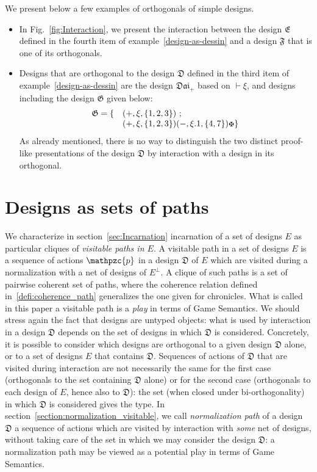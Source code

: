 \documentclass{LMCS}
\newcommand{\design}[1]{{\mathfrak{#1}}}
\newcommand{\pathLL}[1]{\mathpzc{#1}}\newcommand{\strategy}[1]{\pathLL{#1}}\newcommand{\view}[1]{\raisebox{.3ex}{$\ulcorner$}{#1}\raisebox{.3ex}{$\urcorner$}}\newcommand{\fullview}[1]{\raisebox{.3ex}{$\ulcorner\mkern-6mu\ulcorner\mkern-2mu$}{#1}\raisebox{.3ex}{$\mkern-2mu\urcorner\mkern-6mu\urcorner$}}\newcommand{\views}[1]{\view{#1}}\newcommand{\fullviews}[1]{\fullview{#1}}\newcommand{\shuffle}[1]{\llcorner\design{#1}\lrcorner}\newcommand{\PoD}[1]{{\mathcal{P}}_{#1}}\newcommand{\norm}[1]{\llbracket\design{#1}\rrbracket}
\newcommand{\dai}{\design{Dai}}
\begin{document}
\begin{exa}
We present below a few examples of orthogonals of simple designs.
\begin{itemize}
\item In Fig.~\ref{fig:Interaction}, we present the interaction between the design $\design E$ defined in the fourth item of example~\ref{design-as-dessin} and a design $\design F$ that is one of its orthogonals.
\item 
Designs that are orthogonal to the design $\design D$ defined in the third item of example~\ref{design-as-dessin} are the design $\dai_+$ based on $\vdash\xi$, and designs including the design $\design G$ given below:
$$
\begin{array}{cl}
\design G=\{&(+,\xi,\{1,2,3\})~;\\
 & (+,\xi,\{1,2,3\})(-,\xi.1,\{4,7\})\daimon\}
\end{array}
$$
As already mentioned, there is no way to distinguish the two distinct proof-like  presentations of the design $\design D$ by interaction with a design in its orthogonal.
\end{itemize}
\end{exa}




\section{Designs as sets of paths}\label{sec:Paths}



 We characterize in section~\ref{sec:Incarnation} incarnation of a set of designs $E$ as particular cliques of {\em visitable paths in $E$}. 
 A visitable path in a set of designs $E$ is a sequence of actions $\pathLL{p}$ in a design $\design{D}$ of $E$ which are visited during a normalization with a net of designs of $E^\perp$. A clique of such paths is a set of pairwise coherent set of paths, where the coherence relation defined in~\ref{defi:coherence_path} generalizes the one given for chronicles.
What is called in this paper a visitable path is a {\em play} in terms of Game Semantics. We should stress again the fact that designs are untyped objects: what is used by interaction in a design $\design{D}$ depends on the set of designs in which $\design{D}$ is considered. Concretely, it is possible to consider which designs are orthogonal to a given design $\design D$ alone, or to a set of designs $E$ that contains $\design D$. Sequences of actions of $\design D$ that are visited during interaction are not necessarily the same for the first case (orthogonals to the set containing $\design D$ alone) or for the second case (orthogonals to each design of $E$, hence also to $\design D$): the set (when closed under bi-orthogonality) in which $\design{D}$ is considered gives the type. 
In section~\ref{section:normalization_visitable}, we call {\em normalization path} of a design $\design{D}$ a sequence of actions which are visited by interaction with {\em some} net of designs, without taking care of the set in which we may consider the design $\design{D}$: a normalization path may be viewed as a potential play in terms of Game Semantics.
\end{document}
